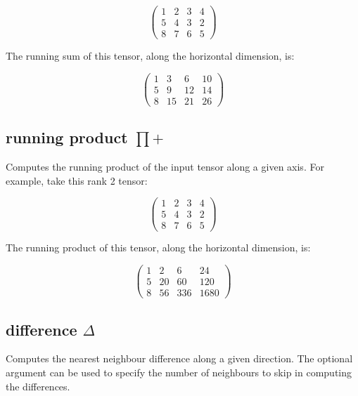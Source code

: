 \begin{displaymath}
  \left(
  \begin{array}{cccc}
    1& 2& 3& 4 \\
    5& 4& 3& 2 \\
    8& 7& 6& 5
  \end{array}
  \right)
\end{displaymath}

The running sum of this tensor, along the horizontal dimension, is: 

\begin{displaymath}
  \left(
  \begin{array}{cccc}
    1& 3& 6& 10 \\
    5& 9& 12& 14 \\
    8& 15& 21& 26
  \end{array}
  \right)
\end{displaymath}

\subsection{running product $\prod+$}
\label{Operation:runningProduct} Computes the running
product of the input tensor along a given axis. For example, take
this rank 2 tensor:

\begin{displaymath}
  \left(
  \begin{array}{cccc}
    1& 2& 3& 4\\ 
    5& 4& 3& 2\\ 
    8& 7& 6& 5 
  \end{array}
  \right)
\end{displaymath}

The running product of this tensor, along the horizontal dimension, is: 

\begin{displaymath}
  \left(
  \begin{array}{cccc}
    1& 2& 6& 24\\ 
    5& 20& 60& 120\\ 
    8& 56& 336& 1680 
  \end{array}
  \right)
\end{displaymath}

\subsection{difference $\Delta$}\label{Operation:difference}
Computes the nearest neighbour difference along a given direction. The
optional argument can be used to specify the number of neighbours to
skip in computing the differences.

